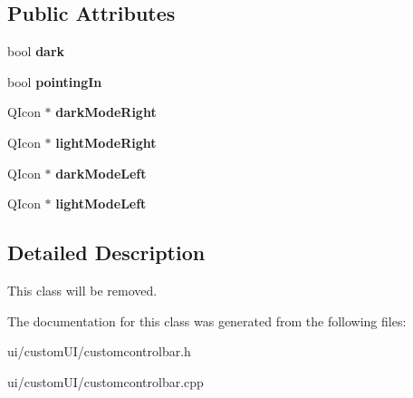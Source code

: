 \subsection*{Public Attributes}
\begin{DoxyCompactItemize}
\item 
\mbox{\label{classui_1_1custom_u_i_1_1_custom_control_bar_a7d084a4f5eeb2e4f4bdde5b28ab420e5}} 
bool {\bfseries dark}
\item 
\mbox{\label{classui_1_1custom_u_i_1_1_custom_control_bar_a71286e6b39628683dbbcb8e9d330bf03}} 
bool {\bfseries pointing\+In}
\item 
\mbox{\label{classui_1_1custom_u_i_1_1_custom_control_bar_a15b8a21c567bc4ac7ae3ef90dd6091f4}} 
Q\+Icon $\ast$ {\bfseries dark\+Mode\+Right}
\item 
\mbox{\label{classui_1_1custom_u_i_1_1_custom_control_bar_a07e012267522c0d7b6087c5240dcbb4f}} 
Q\+Icon $\ast$ {\bfseries light\+Mode\+Right}
\item 
\mbox{\label{classui_1_1custom_u_i_1_1_custom_control_bar_acd10512d13b55401d2642f8f43fc2d17}} 
Q\+Icon $\ast$ {\bfseries dark\+Mode\+Left}
\item 
\mbox{\label{classui_1_1custom_u_i_1_1_custom_control_bar_a1ebb7a5a1aad7f13191e7d47240f7068}} 
Q\+Icon $\ast$ {\bfseries light\+Mode\+Left}
\end{DoxyCompactItemize}


\subsection{Detailed Description}
This class will be removed. 

The documentation for this class was generated from the following files\+:\begin{DoxyCompactItemize}
\item 
ui/custom\+U\+I/customcontrolbar.\+h\item 
ui/custom\+U\+I/customcontrolbar.\+cpp\end{DoxyCompactItemize}
